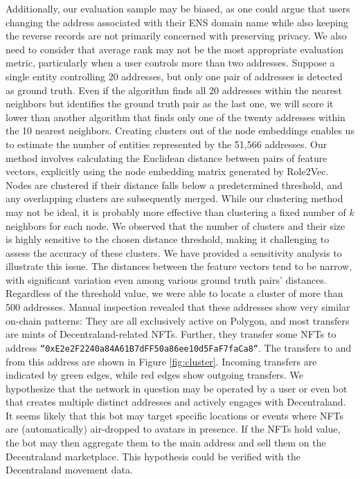 \documentclass[12pt,a4paper,titlepage,oneside,english]{article}
\begin{document}
Additionally, our evaluation sample may be biased, as one could argue that users changing the address associated with their ENS domain name while also keeping the reverse records are not primarily concerned with preserving privacy. \newline
We also need to consider that average rank may not be the most appropriate evaluation metric, particularly when a user controls more than two addresses. Suppose a single entity controlling 20 addresses, but only one pair of addresses is detected as ground truth. Even if the algorithm finds all 20 addresses within the nearest neighbors but identifies the ground truth pair as the last one, we will score it lower than another algorithm that finds only one of the twenty addresses within the 10 nearest neighbors. \newline
Creating clusters out of the node embeddings enables us to estimate the number of entities represented by the 51,566 addresses. Our method involves calculating the Euclidean distance between pairs of feature vectors, explicitly using the node embedding matrix generated by Role2Vec. Nodes are clustered if their distance falls below a predetermined threshold, and any overlapping clusters are subsequently merged. \newline 
While our clustering method may not be ideal, it is probably more effective than clustering a fixed number of $k$ neighbors for each node. We observed that the number of clusters and their size is highly sensitive to the chosen distance threshold, making it challenging to assess the accuracy of these clusters. We have provided a sensitivity analysis to illustrate this issue. The distances between the feature vectors tend to be narrow, with significant variation even among various ground truth pairs' distances. Regardless of the threshold value, we were able to locate a cluster of more than 500 addresses. Manual inspection revealed that these addresses show very similar on-chain patterns: They are all exclusively active on Polygon, and most transfers are mints of Decentraland-related NFTs. Further, they transfer some NFTs to address \texttt{``0xE2e2F2240a84A61B7dFF50a86ee10d5FaF7faCa8``}. The transfers to and from this address are shown in Figure \ref{fig:cluster}. Incoming transfers are indicated by green edges, while red edges show outgoing transfers. We hypothesize that the network in question may be operated by a user or even bot that creates multiple distinct addresses and actively engages with Decentraland. It seems likely that this bot may target specific locations or events where NFTs are (automatically) air-dropped to avatars in presence. If the NFTs hold value, the bot may then aggregate them to the main address and sell them on the Decentraland marketplace. This hypothesis could be verified with the Decentraland movement data. \newline
\end{document}
